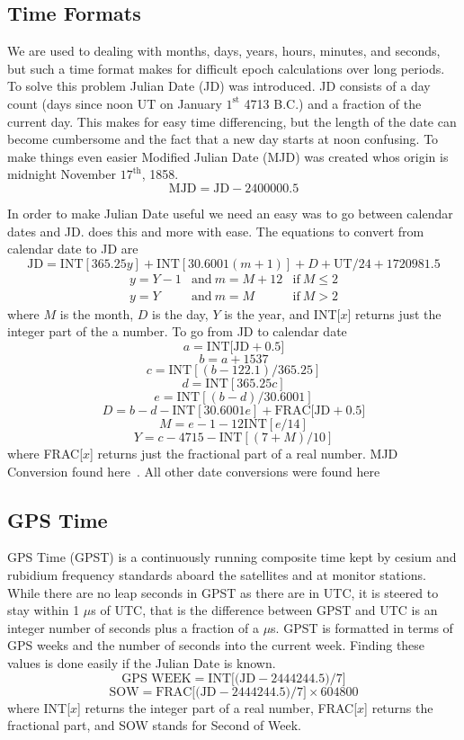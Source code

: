 \subsection{Time Formats}
We are used to dealing with months, days, years, hours, minutes, and seconds, but such a time format makes for difficult epoch calculations over long periods. To solve this problem Julian Date (JD) was introduced. JD consists of a day count (days since noon UT on January $1^{\mbox{st}}$ 4713 B.C.) and a fraction of the current day. This makes for easy time differencing, but the length of the date can become cumbersome and the fact that a new day starts at noon confusing. To make things even easier Modified Julian Date (MJD) was created whos origin is midnight November $17^{\mbox{th}}$, 1858.
\[ \mbox{MJD}=\mbox{JD}-2400000.5\]

In order to make Julian Date useful we need an easy was to go between calendar dates and JD.  does this and more with ease. The equations to convert from calendar date to JD are
\[ \mbox{JD}=\mbox{INT}[365.25y]+\mbox{INT}[30.6001(m+1)]+D+\mbox{UT}/24+1720981.5\]
\[ \begin{array}{lll}
y=Y-1 & \mbox{and}~m=M+12 & \mbox{if}~M \leq2 \\
y=Y & \mbox{and}~m=M & \mbox{if}~M > 2
\end{array} \]
where $M$ is the month, $D$ is the day, $Y$ is the year, and INT[$x$] returns just the integer part of the a number. To go from JD to calendar date
\[ a=\mbox{INT[JD}+0.5] \]
\[ b=a+1537 \]
\[ c=\mbox{INT}[(b-122.1)/365.25] \]
\[ d=\mbox{INT}[365.25c] \]
\[ e=\mbox{INT}[(b-d)/30.6001] \]
\[ D=b-d-\mbox{INT}[30.6001e]+\mbox{FRAC[JD}+0.5] \]
\[ M=e-1-12\mbox{INT}[e/14] \]
\[ Y=c-4715-\mbox{INT}[(7+M)/10] \]
where FRAC[$x$] returns just the fractional part of a real number. MJD Conversion found here~\cite[p. 88]{me:gsmp}. All other date conversions were found here~\cite[pp. 36-37]{hlc:gtp}
\subsection{GPS Time}
GPS Time (GPST) is a continuously running composite time kept by cesium and rubidium frequency standards aboard the satellites and at monitor stations. While there are no leap seconds in GPST as there are in UTC, it is steered to stay within 1 $\mu$s of UTC, that is the difference between GPST and UTC is an integer number of seconds plus a fraction of a $\mu$s. GPST is formatted in terms of GPS weeks and the number of seconds into the current week. Finding these values is done easily if the Julian Date is known.
\[ \mbox{GPS WEEK}=\mbox{INT[(JD}-2444244.5)/7] \]
\[ \mbox{SOW}=\mbox{FRAC[(JD}-2444244.5)/7]\times 604800 \]
where INT[$x$] returns the integer part of a real number, FRAC[$x$] returns the fractional part, and SOW stands for Second of Week.

